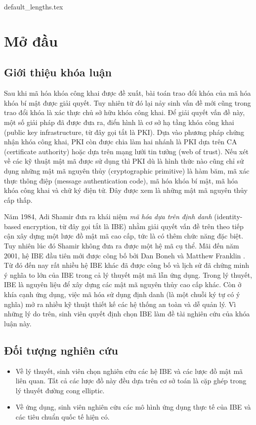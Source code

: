 \documentclass[class=report, crop=false]{standalone}
\begin{document}
	{default_lengths.tex}
	\chapter{Mở đầu}
	\section{Giới thiệu khóa luận}
		Sau khi mã hóa khóa công khai được đề xuất, bài toán trao đổi khóa của mã hóa khóa bí mật được giải quyết. Tuy nhiên từ đó lại nảy sinh vấn đề mới cũng trong trao đổi khóa là xác thực chủ sở hữu khóa công khai. Để giải quyết vấn đề này, một số giải pháp đã được đưa ra, điển hình là cơ sở hạ tầng khóa công khai (public key infrastructure, từ đây gọi tắt là PKI). Dựa vào phương pháp chứng nhận khóa công khai, PKI còn được chia làm hai nhánh là PKI dựa trên CA (certificate authority) hoặc dựa trên mạng lưới tin tưởng (web of trust). Nếu xét về các kỹ thuật mật mã được sử dụng thì PKI dù là hình thức nào cũng chỉ sử dụng những mật mã nguyên thủy (cryptographic primitive) là hàm băm, mã xác thực thông điệp (message authentication code), mã hóa khóa bí mật, mã hóa khóa công khai và chữ ký điện tử. Đây được xem là những mật mã nguyên thủy cấp thấp.

		Năm 1984, Adi Shamir \cite{DBLP:conf/crypto/Shamir84} đưa ra khái niệm \textit{mã hóa dựa trên định danh} (identity-based encryption, từ đây gọi tắt là IBE) nhằm giải quyết vấn đề trên theo tiếp cận xây dựng một lược đồ mật mã cao cấp, tức là có thêm chức năng đặc biệt. Tuy nhiên lúc đó Shamir không đưa ra được một hệ mã cụ thể. Mãi đến năm 2001, hệ IBE đầu tiên mới được công bố bởi Dan Boneh và Matthew Franklin \cite{DBLP:conf/crypto/BonehF01}. Từ đó đến nay rất nhiều hệ IBE khác đã được công bố và lịch sử đã chứng minh ý nghĩa to lớn của IBE trong cả lý thuyết mật mã lẫn ứng dụng. Trong lý thuyết, IBE là nguyên liệu để xây dựng các mật mã nguyên thủy cao cấp khác. Còn ở khía cạnh ứng dụng, việc mã hóa sử dụng định danh (là một chuỗi ký tự có ý nghĩa) mở ra nhiều kỹ thuật thiết kế các hệ thống an toàn và dễ quản lý. Vì những lý do trên, sinh viên quyết định chọn IBE làm đề tài nghiên cứu của khóa luận này.
	\section{Đối tượng nghiên cứu}
		\begin{itemize}
			\item Về lý thuyết, sinh viên chọn nghiên cứu các hệ IBE và các lược đồ mật mã liên quan. Tất cả các lược đồ này đều dựa trên cơ sở toán là cặp ghép trong lý thuyết đường cong elliptic.
			\item Về ứng dụng, sinh viên nghiên cứu các mô hình ứng dụng thực tế của IBE và các tiêu chuẩn quốc tế hiện có.
		\end{itemize}
\end{document}
